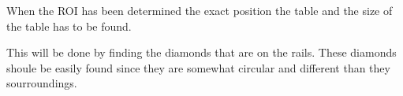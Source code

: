 When the ROI has been determined the exact position the table and the size of the table has to be found.	

This will be done by finding the diamonds that are on the rails. These diamonds shoule be easily found since they are somewhat circular and different than they sourroundings. 